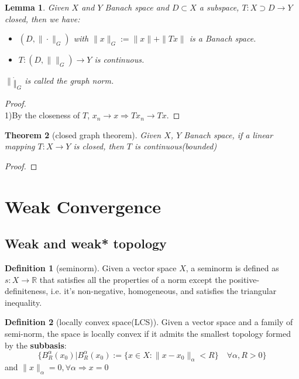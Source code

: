 \documentclass[a4paper,11pt,fleqn]{book}
\newtheorem{theorem}{Theorem}[section]
\newtheorem{lemma}[theorem]{Lemma}
\theoremstyle{definition}
\newtheorem{definition}{Definition}[section]
\theoremstyle{remark}
\begin{document}
\begin{lemma}
	Given $X$ and $Y$ Banach space and $D \subset X$ a subspace, $T: X \supset D \rightarrow Y$ closed, then we have:
	\begin{itemize}
		\item $(D, \| \cdot \|_G)$ with $\|x\|_G:= \|x\| + \|Tx\|$ is a Banach space.
		\item $T: (D, \|\|_G) \rightarrow Y$ is continuous.
	\end{itemize}
	$\|\dot\|_G$ is called the graph norm.
\end{lemma}
\begin{proof}
\quad\\
1)By the closeness of $T$, $x_n \rightarrow x \Rightarrow Tx_n \rightarrow Tx$. 
\end{proof}

\begin{theorem}[closed graph theorem]
	Given $X$, $Y$ Banach space, if a linear mapping $T: X \rightarrow Y$ is closed, then $T$ is continuous(bounded)
\end{theorem}
\begin{proof}
\end{proof}



\newpage
\section{Weak Convergence}
\subsection{Weak and weak* topology}
\begin{definition}[seminorm]
	Given a vector space $X$, a seminorm is defined as $s: X \rightarrow \mathbb{R}$ that satisfies all the properties of a norm except the positive-definiteness, i.e. it's non-negative, homogeneous, and satisfies the triangular inequality.
\end{definition}

\begin{definition}[locally convex space(LCS)]
	Given a vector space and a family of semi-norm, the space is locally convex if it admits the smallest topology formed by the \textbf{subbasis}:
	\begin{equation*}
		\bigg\{B^\alpha_R(x_0)\bigg|B^\alpha_R(x_0):= \{ x \in X : \|x - x_0\|_\alpha < R \} \quad \forall \alpha, R>0 \bigg\}
	\end{equation*}
	and $\|x\|_\alpha = 0, \forall \alpha \Rightarrow x = 0$
\end{definition}
\end{document}
